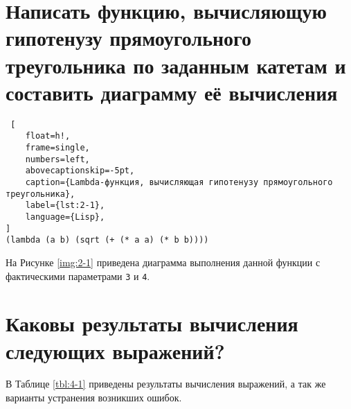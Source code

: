 
\clearpage

\section{Написать функцию, вычисляющую гипотенузу прямоугольного
треугольника по заданным катетам и составить диаграмму её вычисления}

\begin{lstlisting} [
	float=h!,
	frame=single,
	numbers=left,
	abovecaptionskip=-5pt,
	caption={Lambda-функция, вычисляющая гипотенузу прямоугольного треугольника},
	label={lst:2-1},
	language={Lisp},
]
(lambda (a b) (sqrt (+ (* a a) (* b b))))
\end{lstlisting}

На Рисунке \ref{img:2-1} приведена диаграмма выполнения данной функции с фактическими параметрами \texttt{3} и \texttt{4}.




\section{Каковы результаты вычисления следующих выражений?}

В Таблице \ref{tbl:4-1} приведены результаты вычисления выражений, а так же варианты устранения возникших ошибок.

